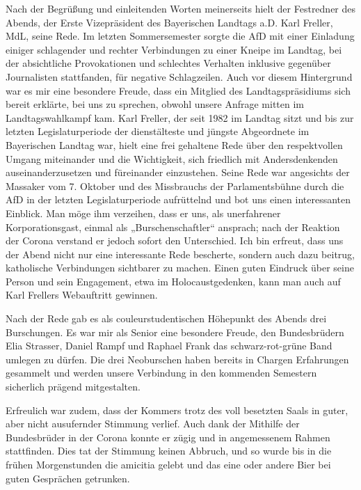 \begin{multicols}{2}
Nach der Begrüßung und einleitenden Worten meinerseits hielt der Festredner des Abends, der Erste Vizepräsident des Bayerischen Landtags a.D. Karl Freller, MdL, seine Rede. Im letzten Sommersemester sorgte die AfD mit einer Einladung einiger schlagender und rechter Verbindungen zu einer Kneipe im Landtag, bei der absichtliche Provokationen und schlechtes Verhalten inklusive gegenüber Journalisten stattfanden, für negative Schlagzeilen. Auch vor diesem Hintergrund war es mir eine besondere Freude, dass ein Mitglied des Landtagspräsidiums sich bereit erklärte, bei uns zu sprechen, obwohl unsere Anfrage mitten im Landtagswahlkampf kam. Karl Freller, der seit 1982 im Landtag sitzt und bis zur letzten Legislaturperiode der dienstälteste und jüngste Abgeordnete im Bayerischen Landtag war, hielt eine frei gehaltene Rede über den respektvollen Umgang miteinander und die Wichtigkeit, sich friedlich mit Andersdenkenden auseinanderzusetzen und füreinander einzustehen. Seine Rede war angesichts der Massaker vom 7. Oktober und des Missbrauchs der Parlamentsbühne durch die AfD in der letzten Legislaturperiode aufrüttelnd und bot uns einen interessanten Einblick. Man möge ihm verzeihen, dass er uns, als unerfahrener Korporationsgast, einmal als „Burschenschaftler“ ansprach; nach der Reaktion der Corona verstand er jedoch sofort den Unterschied. Ich bin erfreut, dass uns der Abend nicht nur eine interessante Rede bescherte, sondern auch dazu beitrug, katholische Verbindungen sichtbarer zu machen. Einen guten Eindruck über seine Person und sein Engagement, etwa im Holocaustgedenken, kann man auch auf Karl Frellers Webauftritt gewinnen.

Nach der Rede gab es als couleurstudentischen Höhepunkt des Abends drei Burschungen. Es war mir als Senior eine besondere Freude, den Bundesbrüdern Elia Strasser, Daniel Rampf und Raphael Frank das schwarz-rot-grüne Band umlegen zu dürfen. Die drei Neoburschen haben bereits in Chargen Erfahrungen gesammelt und werden unsere Verbindung in den kommenden Semestern sicherlich prägend mitgestalten.

Erfreulich war zudem, dass der Kommers trotz des voll besetzten Saals in guter, aber nicht ausufernder Stimmung verlief. Auch dank der Mithilfe der Bundesbrüder in der Corona konnte er zügig und in angemessenem Rahmen stattfinden. Dies tat der Stimmung keinen Abbruch, und so wurde bis in die frühen Morgenstunden die amicitia gelebt und das eine oder andere Bier bei guten Gesprächen getrunken.


\end{multicols}
